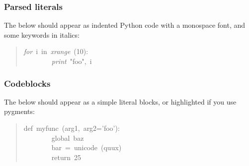 \documentclass[t]{beamer}
\begin{document}
\begin{frame}[fragile]
\frametitle{Parsed literals}


The below should appear as indented Python code with a monospace font, and
some keywords in italics:
%
\begin{quote}{\ttfamily \raggedright \noindent
\emph{for}~i~in~\emph{xrange}~(10):\\
~~~~~~~~\emph{print}~"foo",~i
}
\end{quote}

\end{frame}

\begin{frame}[fragile]
\frametitle{Codeblocks}


The below should appear as a simple literal blocks, or highlighted if you use pygments:
%
\begin{quote}{\ttfamily \raggedright \noindent
def~myfunc~(arg1,~arg2='foo'):\\
~~~~~~~~global~baz\\
~~~~~~~~bar~=~unicode~(quux)\\
~~~~~~~~return~25
}
\end{quote}

\end{frame}
\end{document}
